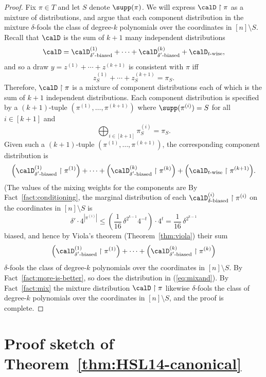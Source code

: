 \documentclass{toc}
\theoremstyle{plain}
\newcommand{\uhr}{\upharpoonright}
\begin{document}
\begin{proof}
Fix $\pi \in T$ and let $S$ denote $\supp(\pi)$. We will express $\calD \uhr {\pi}$ as a mixture of distributions, and argue that each component distribution in the mixture $\delta$-fools the class of degree-$k$ polynomials over the coordinates in $[n]\setminus S$. Recall that $\calD$ is the sum of $k+1$ many independent distributions
 \[ \calD = \calD^{(1)}_{\text{$\delta'$-biased}} + \cdots + \calD^{(k)}_{\text{$\delta'$-biased}} + \calD_{\text{$t$-wise}}, \]
and so a draw $y = z^{(1)} + \cdots + z^{(k+1)}$ is consistent with $\pi$ iff 
\[ z^{(1)}_S + \cdots + z^{(k+1)}_S = \pi_S. \] 
Therefore, $\calD \uhr \pi$ is a mixture of component distributions each of which is the sum of $k+1$ independent distributions.  Each component distribution is specified by a $(k+1)$-tuple $(\pi^{(1)},\dots,\pi^{(k+1)})$ 
where $\supp(\pi^{(i)}) = S$ for all $i \in [k+1]$ and 
\[ \bigoplus_{i\in [k+1]} \pi^{(i)}_S = \pi_S.\]
Given such a 
$(k+1)$-tuple $(\pi^{(1)},\dots,\pi^{(k+1)})$, the corresponding component distribution is
\begin{equation} \Big(\calD^{(1)}_{\text{$\delta'$-biased}} \uhr \pi^{(1)}\Big) + \cdots + \Big(\calD^{(k)}_{\text{$\delta'$-biased}} \uhr \pi^{(k)}\Big) + \Big(\calD_{\text{$t$-wise}} \uhr 
\pi^{(k+1)}\Big). \label{eq:mixand}
\end{equation}
(The values of the mixing weights for the components are
%
By Fact~\ref{fact:conditioning}, the marginal distribution of each $\calD^{(i)}_{\text{$\delta$-biased}} \uhr \pi^{(i)}$ on the coordinates in $[n]\setminus S$ is 
\[ \delta' \cdot 4^{|\pi^{(i)}|} \le  \left(\frac1{16}\,\delta^{2^{k-1}}4^{-t}\right) \cdot 4^t =  \frac1{16}\,\delta^{2^{k-1}} \]
biased, and hence by Viola's theorem (Theorem~\ref{thm:viola}) their sum 
\[  \Big(\calD^{(1)}_{\text{$\delta'$-biased}} \uhr \pi^{(1)}\Big) + \cdots + \Big(\calD^{(k)}_{\text{$\delta'$-biased}} \uhr \pi^{(k)}\Big)  \] 
$\delta$-fools the class of degree-$k$ polynomials over the coordinates in $[n] \setminus S$. By Fact~\ref{fact:more-is-better}, so does the distribution in (\ref{eq:mixand}).  By Fact~\ref{fact:mix} the mixture distribution $\calD \uhr \pi$ likewise
$\delta$-fools the class of degree-$k$ polynomials over the coordinates in $[n] \setminus S$, and the proof is complete.
\end{proof} 

%

 
\appendix

\section{Proof sketch of Theorem~\ref{thm:HSL14-canonical}} \label{sec:HSL14-proof}
\end{document}
